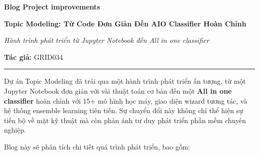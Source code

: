 \documentclass[a4paper,12pt]{article}
\begin{document}
\newpage

\begin{center}
    \vspace*{2em}
    {\LARGE\bfseries Blog Project improvements \par}
    \vspace{0.5em}
    {\Huge\bfseries Topic Modeling: Từ Code Đơn Giản Đến AIO Classifier Hoàn Chỉnh \par}
    \vspace{1em}
    {\Large\itshape Hành trình phát triển từ Jupyter Notebook đến All in one classifier \par}
    \vspace{2em}
    {\large\textbf{Tác giả:} GRID034} \\
    \vspace{2em}
    \hrule
    \vspace{1.5em}
\end{center}

\vspace{1em}
\noindent
Dự án Topic Modeling đã trải qua một hành trình phát triển ấn tượng, từ một Jupyter Notebook đơn giản với vài thuật toán cơ bản đến một \textbf{All in one classifier} hoàn chỉnh với 15+ mô hình học máy, giao diện wizard tương tác, và hệ thống ensemble learning tiên tiến. Sự chuyển đổi này không chỉ thể hiện sự tiến bộ về mặt kỹ thuật mà còn phản ánh tư duy phát triển phần mềm chuyên nghiệp.

\vspace{1em}
\noindent
Blog này sẽ phân tích chi tiết quá trình phát triển, bao gồm:
\end{document}
